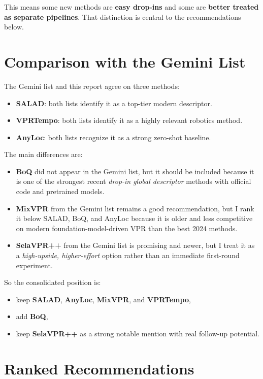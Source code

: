 \documentclass[11pt]{article}
\begin{document}
This means some new methods are \textbf{easy drop-ins} and some are \textbf{better treated as separate pipelines}. That distinction is central to the recommendations below.

\section*{Comparison with the Gemini List}
The Gemini list and this report agree on three methods:
\begin{itemize}[leftmargin=*]
  \item \textbf{SALAD}: both lists identify it as a top-tier modern descriptor.
  \item \textbf{VPRTempo}: both lists identify it as a highly relevant robotics method.
  \item \textbf{AnyLoc}: both lists recognize it as a strong zero-shot baseline.
\end{itemize}

The main differences are:
\begin{itemize}[leftmargin=*]
  \item \textbf{BoQ} did not appear in the Gemini list, but it should be included because it is one of the strongest recent \emph{drop-in global descriptor} methods with official code and pretrained models.
  \item \textbf{MixVPR} from the Gemini list remains a good recommendation, but I rank it below SALAD, BoQ, and AnyLoc because it is older and less competitive on modern foundation-model-driven VPR than the best 2024 methods.
  \item \textbf{SelaVPR++} from the Gemini list is promising and newer, but I treat it as a \emph{high-upside, higher-effort} option rather than an immediate first-round experiment.
\end{itemize}

So the consolidated position is:
\begin{itemize}[leftmargin=*]
  \item keep \textbf{SALAD}, \textbf{AnyLoc}, \textbf{MixVPR}, and \textbf{VPRTempo},
  \item add \textbf{BoQ},
  \item keep \textbf{SelaVPR++} as a strong notable mention with real follow-up potential.
\end{itemize}

\section*{Ranked Recommendations}
\end{document}
